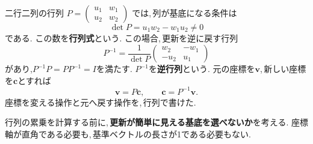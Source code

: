 二行二列の行列
$P=\begin{pmatrix}u_1&w_1\\u_2&w_2\end{pmatrix}$
では,\,列が基底になる条件は
\[
 \det P=u_1w_2-w_1u_2\ne0
\]
である. この数を\textbf{行列式}という.
この場合,\,更新を逆に戻す行列
\[
 P^{-1}
 =\frac1{\det P}
 \begin{pmatrix}w_2&-w_1\\-u_2&u_1\end{pmatrix}
\]
があり,$P^{-1}P=PP^{-1}=I$を満たす.
$P^{-1}$を\textbf{逆行列}という.
元の座標を$\boldsymbol v$,\,新しい座標を$\boldsymbol c$とすれば
\[
 \boldsymbol v=P\boldsymbol c,\qquad
 \boldsymbol c=P^{-1}\boldsymbol v.
\]
座標を変える操作と元へ戻す操作を,\,行列で書けた.

\begin{bookpoint}
行列の累乗を計算する前に,\,\textbf{更新が簡単に見える基底を選べないか}を考える.
座標軸が直角である必要も,\,基準ベクトルの長さが1である必要もない.
\end{bookpoint}

